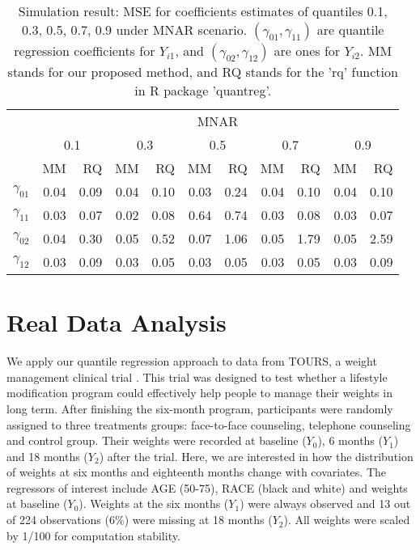\documentclass[12pt]{article}
\begin{document}
\begin{table}[h]
  \renewcommand{\arraystretch}{1.3}
  \centering
  \caption{Simulation result: MSE for coefficients estimates of quantiles
    0.1, 0.3, 0.5, 0.7, 0.9 under MNAR scenario. $(\gamma_{01}, \gamma_{11})$
    are quantile regression coefficients for $Y_{i1}$, and $(\gamma_{02}, \gamma_{12})$
    are ones for $Y_{i2}$. MM stands for our proposed method, and RQ stands for the 'rq'
    function in R package 'quantreg'.}
  \vspace{10pt}
  \begin{tabular}{rrrrrrrrrrr}
    \toprule
    & \multicolumn{ 10}{c}{MNAR} \\
    \cline{2-11}
    &  \multicolumn{2}{c}{0.1} &  \multicolumn{2}{c}{0.3} &  \multicolumn{2}{c}{0.5}
    &  \multicolumn{2}{c}{0.7} &  \multicolumn{2}{c}{0.9} \\
    \cline{2-11}
    & MM & RQ    & MM & RQ    & MM & RQ    & MM & RQ    & MM & RQ \\
    \hline
    $\gamma_{01}$ & 0.04 &0.09&0.04 &0.10 &0.03 &0.24 &0.04 &0.10 &0.04 &0.10 \\
    $\gamma_{11}$ & 0.03 &0.07&0.02 &0.08 &0.64 &0.74 &0.03 &0.08 &0.03 &0.07 \\
    $\gamma_{02}$ & 0.04 &0.30&0.05 &0.52 &0.07 &1.06 &0.05 &1.79 &0.05 &2.59 \\
    $\gamma_{12}$ & 0.03 &0.09&0.03 &0.05 &0.03 &0.05 &0.03 &0.05 &0.03 &0.09 \\
    \bottomrule
  \end{tabular}  \label{tab:sim2}
\end{table}

\section{Real Data Analysis}
\label{sec:real}
We apply our quantile regression approach to data from TOURS, a weight
management clinical trial \citep{perri2008extended}.  This trial was
designed to test whether a lifestyle modification program could
effectively help people to manage their weights in long term. After
finishing the six-month program, participants were randomly assigned
to three treatments groups: face-to-face counseling, telephone
counseling and control group. Their weights were recorded at baseline
($Y_0$), 6 months ($Y_1$) and 18 months ($Y_2$) after the trial. Here,
we are interested in how the distribution of weights at six months and
eighteenth months change with covariates. The regressors of interest
include AGE (50-75), RACE (black and white) and weights at baseline
($Y_0$). Weights at the six months ($Y_1$) were always observed and 13
out of 224 observations (6\%) were missing at 18 months ($Y_2$). All
weights were scaled by 1/100 for computation stability.
\end{document}
